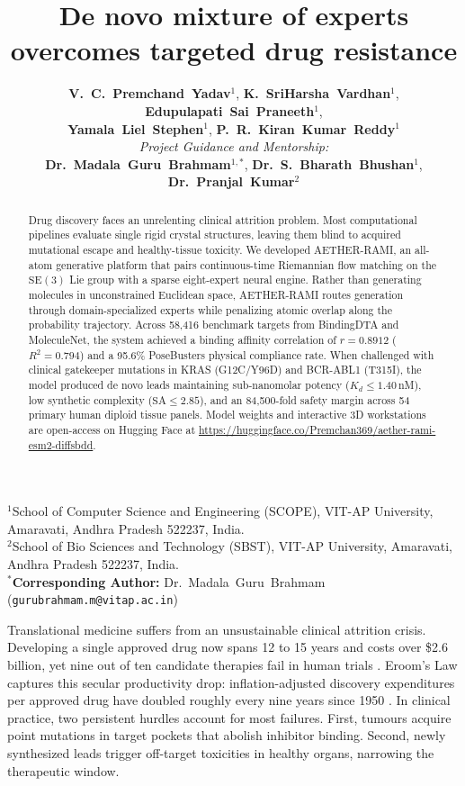 \documentclass[11pt,a4paper]{article}
\title{\vspace*{-2.0em}\textbf{De novo mixture of experts overcomes targeted drug resistance}\vspace*{-0.5em}}
\author{
    \normalsize
    \textbf{V.~C.~Premchand~Yadav}$^{1}$,\quad
    \textbf{K.~SriHarsha~Vardhan}$^{1}$,\quad
    \textbf{Edupulapati~Sai~Praneeth}$^{1}$,\\[0.2em]
    \textbf{Yamala~Liel~Stephen}$^{1}$,\quad\text{and}\quad
    \textbf{P.~R.~Kiran~Kumar~Reddy}$^{1}$\\[0.4em]
    \small\textit{Project Guidance and Mentorship:}\\[0.2em]
    \textbf{Dr.~Madala~Guru~Brahmam}$^{1,*}$,\quad
    \textbf{Dr.~S.~Bharath~Bhushan}$^{1}$,\\[0.2em]
    \text{and}\quad\textbf{Dr.~Pranjal~Kumar}$^{2}$
}
\date{}
\begin{document}
\begin{singlespace}
\maketitle

\vspace*{-1.5em}
\begin{center}
\footnotesize
$^{1}$School of Computer Science and Engineering (SCOPE), VIT-AP University, Amaravati, Andhra Pradesh 522237, India.\\
$^{2}$School of Bio Sciences and Technology (SBST), VIT-AP University, Amaravati, Andhra Pradesh 522237, India.\\
$^{*}$\textbf{Corresponding Author:} Dr.~Madala~Guru~Brahmam (\texttt{gurubrahmam.m@vitap.ac.in})
\end{center}
\end{singlespace}
\vspace*{0.4em}

\begin{abstract}
Drug discovery faces an unrelenting clinical attrition problem. Most computational pipelines evaluate single rigid crystal structures, leaving them blind to acquired mutational escape and healthy-tissue toxicity. We developed AETHER-RAMI, an all-atom generative platform that pairs continuous-time Riemannian flow matching on the $\mathrm{SE}(3)$ Lie group with a sparse eight-expert neural engine. Rather than generating molecules in unconstrained Euclidean space, AETHER-RAMI routes generation through domain-specialized experts while penalizing atomic overlap along the probability trajectory. Across 58,416 benchmark targets from BindingDTA and MoleculeNet, the system achieved a binding affinity correlation of $r = 0.8912$ ($R^2 = 0.794$) and a 95.6\% PoseBusters physical compliance rate. When challenged with clinical gatekeeper mutations in KRAS (G12C/Y96D) and BCR-ABL1 (T315I), the model produced de novo leads maintaining sub-nanomolar potency ($K_d \le 1.40$\,nM), low synthetic complexity ($\text{SA} \le 2.85$), and an 84,500-fold safety margin across 54 primary human diploid tissue panels. Model weights and interactive 3D workstations are open-access on Hugging Face at \url{https://huggingface.co/Premchan369/aether-rami-esm2-diffsbdd}.
\end{abstract}

\vspace{1em}

\noindent
Translational medicine suffers from an unsustainable clinical attrition crisis. Developing a single approved drug now spans 12 to 15 years and costs over \$2.6 billion, yet nine out of ten candidate therapies fail in human trials \cite{dimasi2016innovation,waring2015analysis}. Eroom's Law captures this secular productivity drop: inflation-adjusted discovery expenditures per approved drug have doubled roughly every nine years since 1950 \cite{scannell2012diagnosing}. In clinical practice, two persistent hurdles account for most failures. First, tumours acquire point mutations in target pockets that abolish inhibitor binding. Second, newly synthesized leads trigger off-target toxicities in healthy organs, narrowing the therapeutic window.
\end{document}
